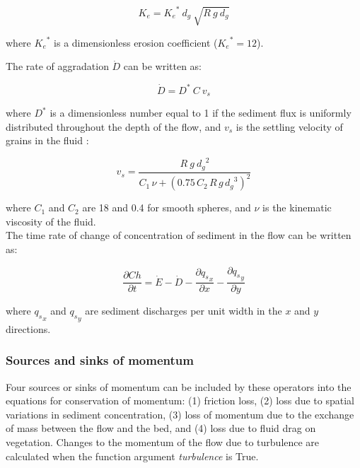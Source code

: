 \documentclass[10pt]{article}
\begin{document}
\begin{equation}
K_e = {K_e}^* \: d_g \: \sqrt{R \: g \: d_g}
\end{equation}

\noindent where ${K_e}^*$ is a dimensionless erosion coefficient (${K_e}^* = 12$).

The rate of aggradation $\dot{D}$ can be written as:

\begin{equation}
\dot{D} = D^* \: C \: v_s
\end{equation}

\noindent where $D^*$ is a dimensionless number equal to 1 if the sediment flux is uniformly distributed throughout the depth of the flow, and $v_s$ is the settling velocity of grains in the fluid \citep{ferguson2004simple}:

\begin{equation}
v_s = \frac{R \: g \: {d_g}^2}{C_1 \, \nu + (0.75 \, C_2 \, R \, g \, {d_g}^3)^2}
\end{equation}

\noindent where $C_1$ and $C_2$ are 18 and 0.4 for smooth spheres, and $\nu$ is the kinematic viscosity of the fluid. 
\ \\

The time rate of change of concentration of sediment in the flow can be written as:

\begin{equation}
\frac{\partial C h}{\partial t} = \dot{E} -\dot{D} - \frac{\partial {q_s}_x}{\partial x} - \frac{\partial {q_s}_y}{\partial y}
\end{equation}

\noindent where ${q_s}_x$ and ${q_s}_y$ are sediment discharges per unit width in the $x$ and $y$ directions.

\subsubsection{Sources and sinks of momentum}

Four sources or sinks of momentum can be included by these operators into the equations for conservation of momentum: (1) friction loss, (2) loss due to spatial variations in sediment concentration, (3) loss of momentum due to the exchange of mass between the flow and the bed, and (4) loss due to fluid drag on vegetation. Changes to the momentum of the flow due to turbulence are calculated when the function argument \textit{turbulence} is True.
\end{document}
